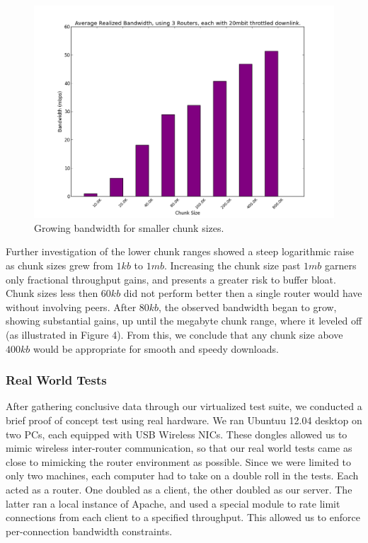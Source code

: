 \documentclass[12pt]{article}
\begin{document}
		\begin{figure}[H]
			\centering
			\includegraphics[keepaspectratio=true,scale=0.6]{small_sizes.png}
			\caption{Growing bandwidth for smaller chunk sizes.}
		\end{figure}

		Further investigation of the lower chunk ranges showed a steep logarithmic raise as chunk sizes grew from $1 kb$ to $1 mb$. Increasing the chunk size past $1 mb$ garners only fractional throughput gains, and presents a greater risk to buffer bloat. Chunk sizes less then $60 kb$ did not perform better then a single router would have without involving peers. After $80 kb$, the observed bandwidth began to grow, showing substantial gains, up until the megabyte chunk range, where it leveled off (as illustrated in Figure 4). From this, we conclude that any chunk size above $400 kb$ would be appropriate for smooth and speedy downloads. 

	\subsubsection{Real World Tests}

		After gathering conclusive data through our virtualized test suite, we conducted a brief proof of concept test using real hardware. We ran Ubuntuu 12.04 desktop on two PCs, each equipped with USB Wireless NICs. These dongles allowed us to mimic wireless inter-router communication, so that our real world tests came as close to mimicking the router environment as possible. Since we were limited to only two machines, each computer had to take on a double roll in the tests. Each acted as a router. One doubled as a client, the other doubled as our server. The latter ran a local instance of Apache, and used a special module to rate limit connections from each client to a specified throughput. This allowed us to enforce per-connection bandwidth constraints. 
\end{document}
